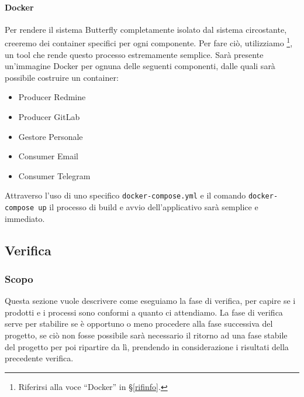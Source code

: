 		\paragraph{Docker}\label{Docker} %
		Per rendere il sistema Butterfly completamente isolato dal sistema circostante, creeremo dei container specifici per ogni componente. Per fare ciò, utilizziamo
		\footnote{Riferirsi alla voce ``Docker'' in \S\ref{rifinfo}.},
		un tool che rende questo processo estremamente semplice. Sarà presente un'immagine Docker per ognuna delle seguenti componenti, dalle quali sarà possibile costruire un container:
		\begin{itemize}
			\item Producer Redmine
			\item Producer GitLab
			\item Gestore Personale
			\item Consumer Email
			\item Consumer Telegram
		\end{itemize}
		Attraverso l'uso di uno specifico \texttt{docker-compose.yml} e il comando \texttt{docker-compose up} il processo di build e avvio dell'applicativo sarà semplice e immediato.


	\subsection{Verifica}\label{Verifica}

		\subsubsection{Scopo}
		Questa sezione vuole descrivere come eseguiamo la fase di verifica, per capire se i prodotti e i processi sono conformi a quanto ci attendiamo.
		La fase di verifica serve per stabilire se è opportuno o meno procedere alla fase successiva del progetto, se ciò non fosse possibile sarà necessario il
		ritorno ad una fase stabile del progetto per poi ripartire da lì, prendendo in considerazione i risultati della precedente verifica.


